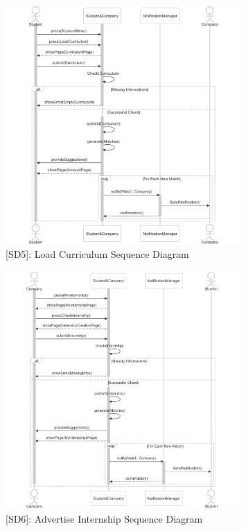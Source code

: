 \begin{figure}
    \centering
    \includegraphics[width=0.8\textwidth]{Latex/Images/LoadCurriculumSequenceDiagram.png}
    \caption{[SD5]: Load Curriculum Sequence Diagram}
    \label{fig:SD5}
\end{figure}
\clearpage

\begin{figure}
    \centering
    \includegraphics[width=0.8\textwidth]{Latex/Images/AdvertiseInternshipSequenceDiagram.png}
    \caption{[SD6]: Advertise Internship Sequence Diagram}
    \label{fig:SD6}
\end{figure}
\clearpage

